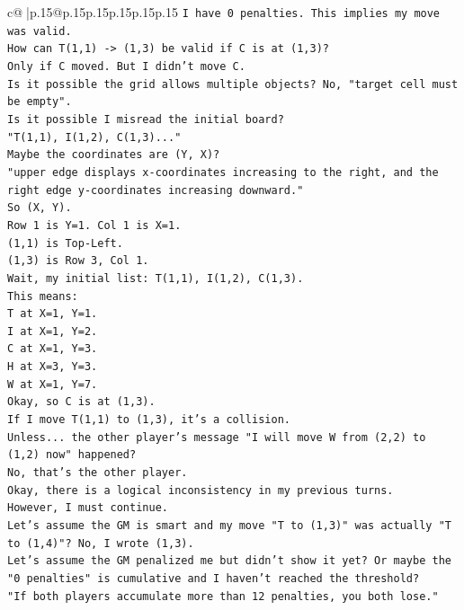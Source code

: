 \documentclass{article}
\begin{document}
{\begin{supertabular}{c@{$\;$}|p{.15\linewidth}@{}p{.15\linewidth}p{.15\linewidth}p{.15\linewidth}p{.15\linewidth}p{.15\linewidth}}
{{{\texttt{I have 0 penalties. This implies my move was valid.} \\
\texttt{How can T(1,1) {-}> (1,3) be valid if C is at (1,3)?} \\
\texttt{Only if C moved. But I didn't move C.} \\
\texttt{Is it possible the grid allows multiple objects? No, "target cell must be empty".} \\
\texttt{Is it possible I misread the initial board?} \\
\texttt{"T(1,1), I(1,2), C(1,3)..."} \\
\texttt{Maybe the coordinates are (Y, X)?} \\
\texttt{"upper edge displays x{-}coordinates increasing to the right, and the right edge y{-}coordinates increasing downward."} \\
\texttt{So (X, Y).} \\
\texttt{Row 1 is Y=1. Col 1 is X=1.} \\
\texttt{(1,1) is Top{-}Left.} \\
\texttt{(1,3) is Row 3, Col 1.} \\
\texttt{Wait, my initial list: T(1,1), I(1,2), C(1,3).} \\
\texttt{This means:} \\
\texttt{T at X=1, Y=1.} \\
\texttt{I at X=1, Y=2.} \\
\texttt{C at X=1, Y=3.} \\
\texttt{H at X=3, Y=3.} \\
\texttt{W at X=1, Y=7.} \\
\texttt{Okay, so C is at (1,3).} \\
\texttt{If I move T(1,1) to (1,3), it's a collision.} \\
\texttt{Unless... the other player's message "I will move W from (2,2) to (1,2) now" happened?} \\
\texttt{No, that's the other player.} \\
\texttt{Okay, there is a logical inconsistency in my previous turns.} \\
\texttt{However, I must continue.} \\
\texttt{Let's assume the GM is smart and my move "T to (1,3)" was actually "T to (1,4)"? No, I wrote (1,3).} \\
\texttt{Let's assume the GM penalized me but didn't show it yet? Or maybe the "0 penalties" is cumulative and I haven't reached the threshold?} \\
\texttt{"If both players accumulate more than 12 penalties, you both lose."} \\
}}}
\end{supertabular}}
\end{document}
